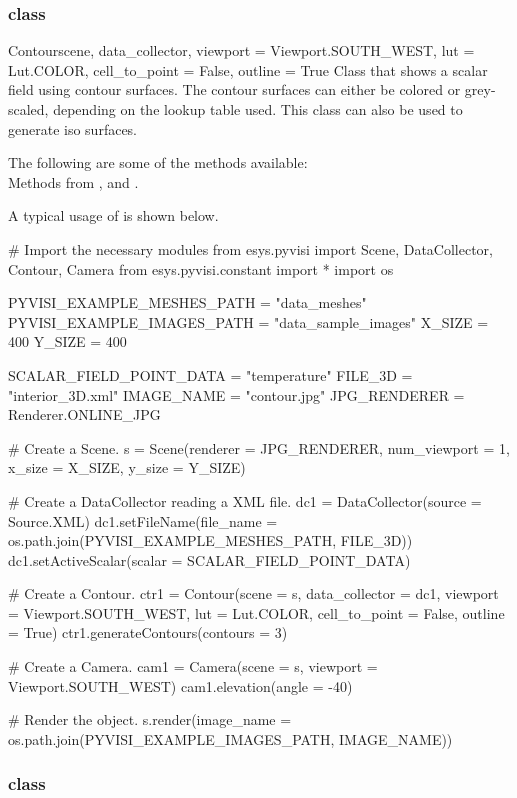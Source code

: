 \subsubsection{\Contour class}

\begin{classdesc}{Contour}{scene, data_collector, 
viewport = Viewport.SOUTH_WEST, lut = Lut.COLOR, cell_to_point = False, 
outline = True}
Class that shows a scalar field using contour surfaces. The contour surfaces can
either be colored or grey-scaled, depending on the lookup table used. This
class can also be used to generate iso surfaces.
\end{classdesc}

The following are some of the methods available:\\
Methods from \ActorThreeD, \ContourModule and \DataSetMapper. 

A typical usage of \Contour is shown below.

\begin{python}
# Import the necessary modules
from esys.pyvisi import Scene, DataCollector, Contour, Camera
from esys.pyvisi.constant import *
import os

PYVISI_EXAMPLE_MESHES_PATH = "data_meshes"
PYVISI_EXAMPLE_IMAGES_PATH = "data_sample_images"
X_SIZE = 400
Y_SIZE = 400

SCALAR_FIELD_POINT_DATA = "temperature"
FILE_3D = "interior_3D.xml"
IMAGE_NAME = "contour.jpg"
JPG_RENDERER = Renderer.ONLINE_JPG

# Create a Scene.
s = Scene(renderer = JPG_RENDERER, num_viewport = 1, x_size = X_SIZE, 
        y_size = Y_SIZE)

# Create a DataCollector reading a XML file.
dc1 = DataCollector(source = Source.XML)
dc1.setFileName(file_name = os.path.join(PYVISI_EXAMPLE_MESHES_PATH, FILE_3D))
dc1.setActiveScalar(scalar = SCALAR_FIELD_POINT_DATA)

# Create a Contour.
ctr1 = Contour(scene = s, data_collector = dc1, viewport = Viewport.SOUTH_WEST,
        lut = Lut.COLOR, cell_to_point = False, outline = True)
ctr1.generateContours(contours = 3)

# Create a Camera.
cam1 = Camera(scene = s, viewport = Viewport.SOUTH_WEST)
cam1.elevation(angle = -40)

# Render the object.
s.render(image_name = os.path.join(PYVISI_EXAMPLE_IMAGES_PATH, IMAGE_NAME))
\end{python}

\subsubsection{\ContourOnPlaneCut class}

